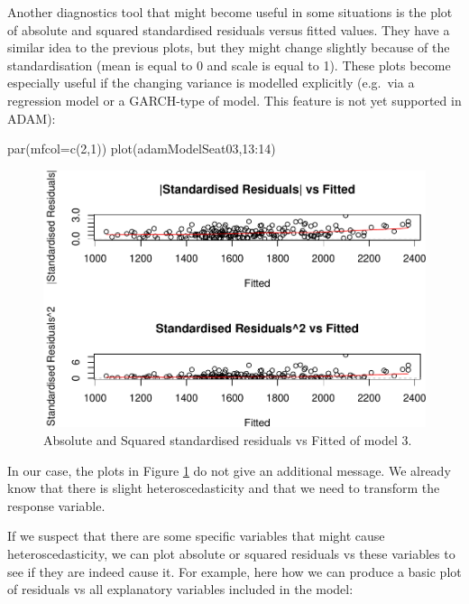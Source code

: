 \documentclass[
]{book}
\newenvironment{Shaded}{\begin{snugshade}}{\end{snugshade}}
\newcommand{\AttributeTok}[1]{\textcolor[rgb]{0.77,0.63,0.00}{#1}}
\newcommand{\DecValTok}[1]{\textcolor[rgb]{0.00,0.00,0.81}{#1}}
\newcommand{\FunctionTok}[1]{\textcolor[rgb]{0.00,0.00,0.00}{#1}}
\newcommand{\NormalTok}[1]{#1}
\newcommand{\SpecialCharTok}[1]{\textcolor[rgb]{0.00,0.00,0.00}{#1}}
\theoremstyle{definition}
\theoremstyle{definition}
\theoremstyle{definition}
\theoremstyle{definition}
\theoremstyle{remark}
\begin{document}
Another diagnostics tool that might become useful in some situations is the plot of absolute and squared standardised residuals versus fitted values. They have a similar idea to the previous plots, but they might change slightly because of the standardisation (mean is equal to 0 and scale is equal to 1). These plots become especially useful if the changing variance is modelled explicitly (e.g.~via a regression model or a GARCH-type of model. This feature is not yet supported in ADAM):

\begin{Shaded}
\begin{Highlighting}[]
\FunctionTok{par}\NormalTok{(}\AttributeTok{mfcol=}\FunctionTok{c}\NormalTok{(}\DecValTok{2}\NormalTok{,}\DecValTok{1}\NormalTok{))}
\FunctionTok{plot}\NormalTok{(adamModelSeat03,}\DecValTok{13}\SpecialCharTok{:}\DecValTok{14}\NormalTok{)}
\end{Highlighting}
\end{Shaded}

\begin{figure}
\centering
\includegraphics{Svetunkov--2022----ADAM_files/figure-latex/adamModelSeat03HeteroStd-1.pdf}
\caption{\label{fig:adamModelSeat03HeteroStd}Absolute and Squared standardised residuals vs Fitted of model 3.}
\end{figure}

In our case, the plots in Figure \ref{fig:adamModelSeat03HeteroStd} do not give an additional message. We already know that there is slight heteroscedasticity and that we need to transform the response variable.

If we suspect that there are some specific variables that might cause heteroscedasticity, we can plot absolute or squared residuals vs these variables to see if they are indeed cause it. For example, here how we can produce a basic plot of residuals vs all explanatory variables included in the model:
\end{document}
